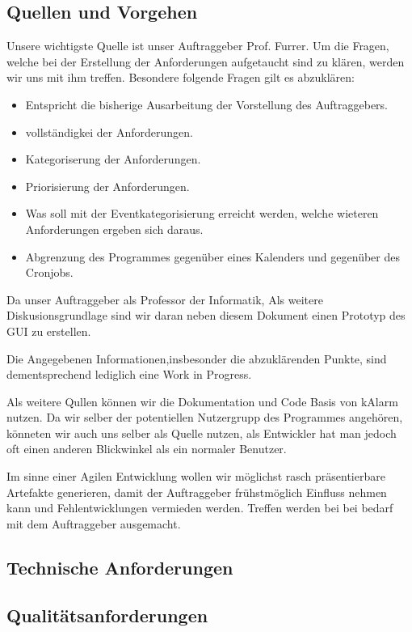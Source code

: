 \documentclass[11pt,titelpage]{scrreprt}
\begin{document}
\subsection{Quellen und Vorgehen}
Unsere wichtigste Quelle ist unser Auftraggeber Prof. Furrer. Um die Fragen, welche bei der Erstellung der Anforderungen aufgetaucht sind zu klären, werden wir uns mit ihm treffen.
Besondere folgende Fragen gilt es abzuklären:

\begin{itemize}
\item Entspricht die bisherige Ausarbeitung der Vorstellung des Auftraggebers.
\item vollständigkei der Anforderungen.
\item Kategoriserung der Anforderungen.
\item Priorisierung der Anforderungen.
\item Was soll mit der Eventkategorisierung erreicht werden, welche wieteren Anforderungen ergeben sich daraus.
\item Abgrenzung des Programmes gegenüber eines Kalenders und gegenüber des Cronjobs.
\end{itemize}
Da unser Auftraggeber als Professor der Informatik,
Als weitere Diskusionsgrundlage sind wir daran neben diesem Dokument einen Prototyp des GUI zu erstellen.


Die Angegebenen Informationen,insbesonder die abzuklärenden Punkte, sind dementsprechend lediglich eine Work in Progress.


Als weitere Qullen können wir die Dokumentation und Code Basis von kAlarm nutzen.
Da wir selber der potentiellen Nutzergrupp des Programmes angehören, könneten wir auch uns selber als Quelle nutzen, als Entwickler hat man jedoch oft einen anderen Blickwinkel als ein normaler Benutzer.


Im sinne einer Agilen Entwicklung wollen wir möglichst rasch präsentierbare Artefakte generieren, damit der Auftraggeber frühstmöglich Einfluss nehmen kann und Fehlentwicklungen vermieden werden. Treffen werden bei bei bedarf mit dem Auftraggeber ausgemacht.


\subsection{Technische Anforderungen}
\subsection{Qualitätsanforderungen}
\end{document}
